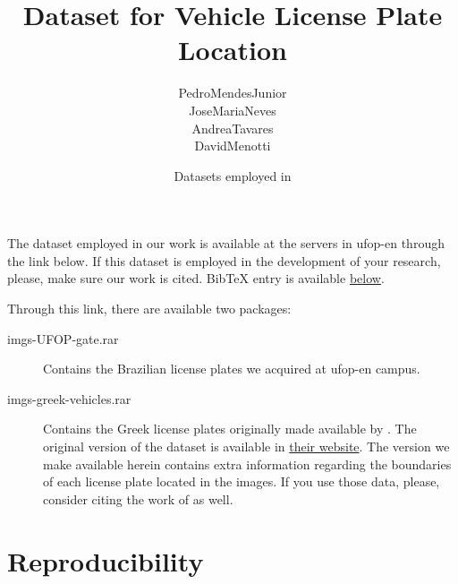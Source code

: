 

% 

\renewcommand\highlightauthorname[1]{#1}

\title{Dataset for Vehicle License Plate Location}
\author{\gls{PedroMendesJunior}\\%
  \gls{JoseMariaNeves}\\%
  \gls{AndreaTavares}\\%
  \gls{DavidMenotti}\\%
}
\date{Datasets employed in }



\maketitle

The dataset employed in our work  is available at the servers in \gls{ufop-en} through the link below.
If this dataset is employed in the development of your research, please, make sure our work  is cited.
BibTeX entry is available \hyperref[ref:MendesJunior2011]{below}.

\begin{center}
\end{center}

Through this link, there are available two packages:

\begin{description}
\item[imgs-UFOP-gate.rar]
  Contains the Brazilian license plates we acquired at \gls{ufop-en} campus.
\item[imgs-greek-vehicles.rar]
  Contains the Greek license plates originally made available by .
  The original version of the dataset is available in \href{http://www.medialab.ntua.gr/research/LPRdatabase.html}{their website}.
  The version we make available herein contains extra information regarding the boundaries of each license plate located in the images.
  If you use those data, please, consider citing the work of  as well.
\end{description}

\section*{Reproducibility}
\label{sec:reproducibility}

